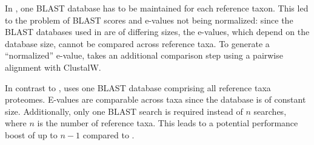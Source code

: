 In \hamstr, one BLAST database has to be maintained for each reference taxon.
This led to the problem of BLAST scores and e-values not being normalized: since
the BLAST databases used in \hamstr are of differing sizes, the e-values, which
depend on the database size, cannot be compared across reference taxa. To
generate a ``normalized'' e-value, \hamstr takes an additional comparison step
using a pairwise alignment with ClustalW.

In contrast to \hamstr, \pname uses one BLAST database comprising all reference
taxa proteomes. E-values are comparable across taxa since the database is of
constant size. Additionally, only one BLAST search is required instead of $n$
searches, where $n$ is the number of reference taxa. This leads to a potential
performance boost of up to $n-1$ compared to \hamstr.
